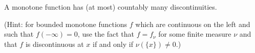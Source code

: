 A monotone function has (at most) countably many discontinuities.

(Hint: for bounded monotone functions $f$ which are continuous on the left and such that $f(-\infty)=0$, use the fact that $f = f_\nu$ for some finite measure $\nu$ and that $f$ is discontinuous at $x$ if and only if $\nu(\{x\}) \neq 0$.)
